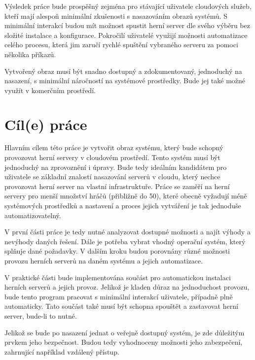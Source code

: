\documentclass{article}
\begin{document}
Výsledek práce bude prospěšný zejména pro stávající uživatele cloudových služeb, kteří mají alespoň minimální
zkušenosti s nasazováním obrazů systémů. S minimální interakcí budou mít možnost spustit herní server dle svého
výběru bez složité instalace a konfigurace. Pokročilí uživatelé využijí možnosti automatizace celého procesu,
která jim zaručí rychlé spuštění vybraného serveru za pomoci několika příkazů.

Vytvořený obraz musí být snadno dostupný a zdokumentovaný, jednoduchý na nasazení, s minimální náročností 
na systémové prostředky. Bude jej také možné využít v komerčním prostředí.

\section{Cíl(e) práce}
Hlavním cílem této práce je vytvořit obraz systému, který bude schopný provozovat herní servery v cloudovém prostředí.
Tento systém musí být jednoduchý na zprovoznění i úpravy. Bude tedy ideálním kandidátem pro uživatele se základní znalostí
nasazování serverů v cloudu, který nechce provozovat herní server na vlastní infrastruktuře.
Práce se zaměří na herní servery pro menší množství hráčů (přibližně do 50), které obecně vyžadují méně systémových prostředků a nastavení
a proces jejich vytváření je tak jednoduše automatizovatelný.

V první části práce je tedy nutné analyzovat dostupné možnosti a najít výhody a nevýhody daných řešení. Dále je potřeba vybrat
vhodný operační systém, který splňuje dané požadavky. V dalším kroku budou porovnány různé možnosti provozu herních serverů
na daném systému a jejich automatizace.

V praktické části bude implementována součást pro automatickou instalaci herních serverů a jejich provoz. Jelikož je kladen důraz
na jednoduchost provozu, bude tento program pracovat s minimální interakcí uživatele, případně plně automaticky.
Tato součást také musí být schopna spouštět a zastavovat herní server, bude-li to nutné.

Jelikož se bude po nasazení jednat o veřejně dostupný systém, je zde důležitým prvkem jeho bezpečnost. Budou tedy vyhodnoceny možnosti
jeho zabezpečení, zahrnující například vzdálený přístup.
\end{document}
